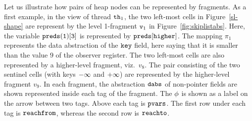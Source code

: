 Let us illustrate how pairs of heap nodes can be represented by fragments.
As a first example, in the view of thread ${\tt th}_1$, the two left-most cells
in Figure~\ref{sl-shape} are represent by the level 1-fragment $\mathtt{v}_1$ in
Figure~\ref{fig:skiplistabs}. Here, the variable $\tt preds(1)[3]$ is represented by $\tt preds[higher]$. The mapping $\pi_1$ represents the data abstraction of
the $\tt key$ field, here saying that it is smaller than the value $9$ of the
observer register.
The two left-most cells are also represented by
a higher-level fragment, viz.\ $v_8$.
The pair consisting of the two sentinel cells (with keys $\tt -\infty$ and $\tt +\infty$) are represented by the higher-level fragment $v_9$. In each fragment, the abstraction $\mathtt{dabs}$ of non-pointer fields are shown represented inside each tag of the fragment. The $\phi$ is shown as a label on the  arrow between two tags. Above each tag is $\mathtt{pvars}$. The first row under each tag is $\mathtt{reachfrom}$, whereas the second row is $\mathtt{reachto}$.
 


